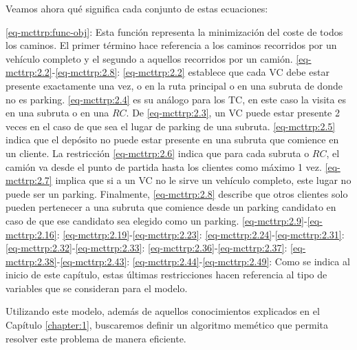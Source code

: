 Veamos ahora qué significa cada conjunto de estas ecuaciones:
\begin{itemize}
     \eqref{eq-mcttrp:func-obj}: Esta función representa la minimización del coste de todos los caminos. El primer término hace referencia a los caminos recorridos por un vehículo completo y el segundo a aquellos recorridos por un camión.
     \eqref{eq-mcttrp:2.2}-\eqref{eq-mcttrp:2.8}: \eqref{eq-mcttrp:2.2} establece que cada VC debe estar presente exactamente una vez, o en la ruta principal o en una subruta de donde no es parking. \eqref{eq-mcttrp:2.4} es su análogo para los TC, en este caso la visita es en una subruta o en una $RC$. De \eqref{eq-mcttrp:2.3}, un VC puede estar presente 2 veces en el caso de que sea el lugar de parking de una subruta. \eqref{eq-mcttrp:2.5} indica que el depósito no puede estar presente en una subruta que comience en un cliente. La restricción \eqref{eq-mcttrp:2.6} indica que para cada subruta o $RC$, el camión va desde el punto de partida hasta los clientes como máximo 1 vez. \eqref{eq-mcttrp:2.7} implica que si a un VC no le sirve un vehículo completo, este lugar no puede ser un parking. Finalmente, \eqref{eq-mcttrp:2.8} describe que otros clientes solo pueden pertenecer a una subruta que comience desde un parking candidato en caso de que ese candidato sea elegido como un parking.
     \eqref{eq-mcttrp:2.9}-\eqref{eq-mcttrp:2.16}: 
     \eqref{eq-mcttrp:2.19}-\eqref{eq-mcttrp:2.23}: 
     \eqref{eq-mcttrp:2.24}-\eqref{eq-mcttrp:2.31}: 
     \eqref{eq-mcttrp:2.32}-\eqref{eq-mcttrp:2.33}:
     \eqref{eq-mcttrp:2.36}-\eqref{eq-mcttrp:2.37}: 
     \eqref{eq-mcttrp:2.38}-\eqref{eq-mcttrp:2.43}: 
     \eqref{eq-mcttrp:2.44}-\eqref{eq-mcttrp:2.49}: Como se indica al inicio de este capítulo, estas últimas restricciones hacen referencia al tipo de variables que se consideran para el modelo. 
\end{itemize}

Utilizando este modelo, además de aquellos conocimientos explicados en el Capítulo \ref{chapter:1}, buscaremos definir un algoritmo memético que permita resolver este problema de manera eficiente.